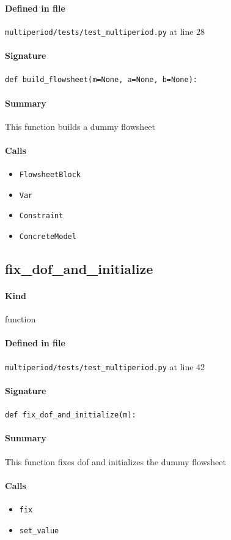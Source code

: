 \documentclass[11pt]{report}
\begin{document}
\paragraph{Defined in file} \texttt{multiperiod/tests/test\_multiperiod.py} at line 28
\paragraph{Signature} \texttt{def build\_flowsheet(m=None, a=None, b=None):}
\paragraph{Summary} This function builds a dummy flowsheet
\paragraph{Calls}
\begin{itemize}[leftmargin=*]
  \item \texttt{FlowsheetBlock}
  \item \texttt{Var}
  \item \texttt{Constraint}
  \item \texttt{ConcreteModel}
\end{itemize}
\subsection{fix\_dof\_and\_initialize}
\label{def:multiperiod-tests-test_multiperiod.py:fix_dof_and_initialize:L42}
\paragraph{Kind} function
\paragraph{Defined in file} \texttt{multiperiod/tests/test\_multiperiod.py} at line 42
\paragraph{Signature} \texttt{def fix\_dof\_and\_initialize(m):}
\paragraph{Summary} This function fixes dof and initializes the dummy flowsheet
\paragraph{Calls}
\begin{itemize}[leftmargin=*]
  \item \texttt{fix}
  \item \texttt{set\_value}
\end{itemize}
\end{document}
